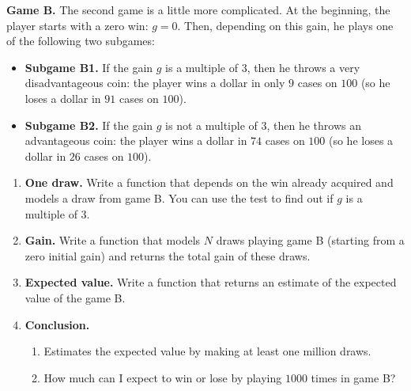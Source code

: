 \documentclass[11pt,class=report,crop=false]{standalone}
\begin{document}
  



\begin{activite}


\textbf{Game B.} The second game is a little more complicated. At the beginning, the player starts with a zero win: $g=0$. Then, depending on this gain, he plays one of the following two subgames:
\begin{itemize}
  \item \textbf{Subgame B1.} If the gain $g$ is a multiple of $3$, then he throws a very disadvantageous coin: the player wins a dollar in only $9$ cases on $100$ (so he loses a dollar in $91$ cases on $100$).
  
  \item \textbf{Subgame B2.} If the gain $g$ is not a multiple of $3$, then he throws an advantageous coin: the player wins a dollar in $74$ cases on $100$ (so he loses a dollar in $26$ cases on $100$).
\end{itemize}

\begin{enumerate}
  \item \textbf{One draw.}
  Write a  function that depends on the win already acquired and models a draw from game B. You can use the  test to find out if $g$ is a multiple of $3$.
  
  \item \textbf{Gain.} Write a function  that models $N$ draws playing game B (starting from a zero initial gain) and returns the total gain of these draws.
  
 
  
  \item \textbf{Expected value.} Write a function  that returns an estimate of the expected value of the game B.
  
  \item \textbf{Conclusion.}
  \begin{enumerate}
    \item Estimates the expected value by making at least one million draws.
    \item How much can I expect to win or lose by playing $1000$ times in game B?
  \end{enumerate}

\end{enumerate}

\end{activite}
\end{document}
